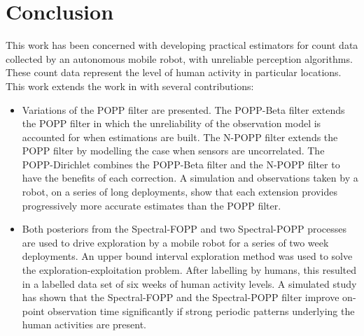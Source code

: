 \section{Conclusion}
\label{sec:conclusion}

This work has been concerned with developing practical estimators for count data collected by an autonomous mobile robot, with unreliable perception algorithms. These count data represent the level of human activity in particular locations. This work extends the work in \cite{jovan18a} with several contributions:

\begin{itemize} 
    \item Variations of the POPP filter are presented. The POPP-Beta filter extends the POPP filter in which the unreliability of the observation model is accounted for when estimations are built. The N-POPP filter extends the POPP filter by modelling the case when sensors are uncorrelated. The POPP-Dirichlet combines the POPP-Beta filter and the N-POPP filter to have the benefits of each correction. A simulation and observations taken by a robot, on a series of long deployments, show that each extension provides progressively more accurate estimates than the POPP filter.  
    \item Both posteriors from the Spectral-FOPP and two Spectral-POPP processes are used to drive exploration by a mobile robot for a series of two week deployments. An upper bound interval exploration method was used to solve the exploration-exploitation problem. After labelling by humans, this resulted in a labelled data set of six weeks of human activity levels. A simulated study has shown that the Spectral-FOPP and the Spectral-POPP filter improve on-point observation time significantly if strong periodic patterns underlying the human activities are present. 
\end{itemize}
        
